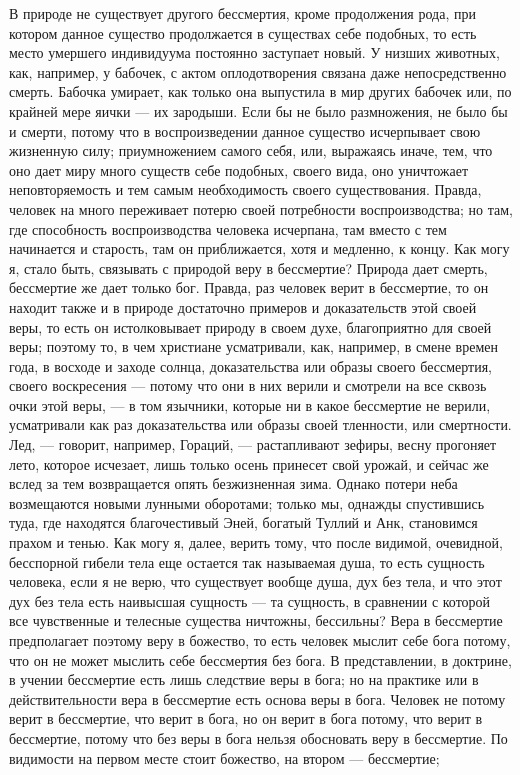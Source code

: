 \documentclass[12pt]{article}
\begin{document}
В природе не существует другого бессмертия, кроме продолжения рода, при котором данное существо продолжается в существах себе подобных, то есть место умершего индивидуума постоянно заступает новый. У низших животных, как, например, у бабочек, с актом оплодотворения связана даже непосредственно смерть. Бабочка умирает, как только она выпустила в мир других бабочек или, по крайней мере яички --- их зародыши. Если бы не было размножения, не было бы и смерти, потому что в воспроизведении данное существо исчерпывает свою жизненную силу; приумножением самого себя, или, выражаясь иначе, тем, что оно дает миру много существ себе подобных, своего вида, оно уничтожает неповторяемость и тем самым необходимость своего существования. Правда, человек на много переживает потерю своей потребности воспроизводства; но там, где способность воспроизводства человека исчерпана, там вместо с тем начинается и старость, там он приближается, хотя и медленно, к концу. Как могу я, стало быть, связывать с природой веру в бессмертие? Природа дает смерть, бессмертие же дает только бог. Правда, раз человек верит в бессмертие, то он находит также и в природе достаточно примеров и доказательств этой своей веры, то есть он истолковывает природу в своем духе, благоприятно для своей веры; поэтому то, в чем христиане усматривали, как, например, в смене времен года, в восходе и заходе солнца, доказательства или образы своего бессмертия, своего воскресения --- потому что они в них верили и смотрели на все сквозь очки этой веры, --- в том язычники, которые ни в какое бессмертие не верили, усматривали как раз доказательства или образы своей тленности, или смертности. Лед, --- говорит, например, Гораций, --- растапливают зефиры, весну прогоняет лето, которое исчезает, лишь только осень принесет свой урожай, и сейчас же вслед за тем возвращается опять безжизненная зима. Однако потери неба возмещаются новыми лунными оборотами; только мы, однажды спустившись туда, где находятся благочестивый Эней, богатый Туллий и Анк, становимся прахом и тенью. Как могу я, далее, верить тому, что после видимой, очевидной, бесспорной гибели тела еще остается так называемая душа, то есть сущность человека, если я не верю, что существует вообще душа, дух без тела, и что этот дух без тела есть наивысшая сущность --- та сущность, в сравнении с которой все чувственные и телесные существа ничтожны, бессильны? Вера в бессмертие предполагает поэтому веру в божество, то есть человек мыслит себе бога потому, что он не может мыслить себе бессмертия без бога. В представлении, в доктрине, в учении бессмертие есть лишь следствие веры в бога; но на практике или в действительности вера в бессмертие есть основа веры в бога. Человек не потому верит в бессмертие, что верит в бога, но он верит в бога потому, что верит в бессмертие, потому что без веры в бога нельзя обосновать веру в бессмертие. По видимости на первом месте стоит божество, на втором --- бессмертие; 
\end{document}
